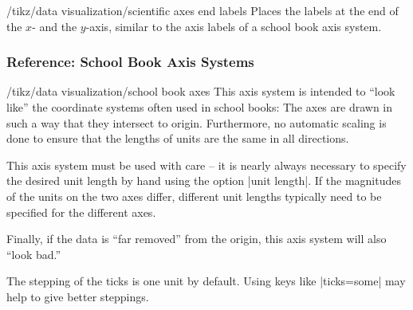 \begin{key}{/tikz/data visualization/scientific axes end labels}
  Places the labels at the end of the $x$- and the $y$-axis, similar
  to the axis labels of a school book axis system.
\begin{codeexample}[]
\end{codeexample}
\end{key}





\subsubsection{Reference: School Book Axis Systems}

\begin{key}{/tikz/data visualization/school book axes}
  This axis system is intended to ``look like'' the coordinate systems
  often used in school books: The axes are drawn in such a way that
  they intersect to origin. Furthermore, no automatic
  scaling is done to ensure that the lengths of units are the same in
  all directions.

  This axis system must be used with care -- it is nearly always
  necessary to specify the desired unit length by hand using the
  option |unit length|. If the magnitudes of the units on the two axes
  differ, different unit lengths typically need to be specified for
  the different axes.

  Finally, if the data is ``far removed'' from the origin, this
  axis system will also ``look bad.''

\begin{codeexample}[]
\end{codeexample}

  The stepping of the ticks is one unit by default. Using keys like
  |ticks=some| may help to give better steppings.
\end{key}


